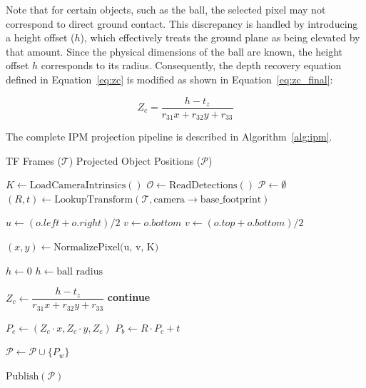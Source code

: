 \documentclass[journal]{IAENGtran}
\begin{document}
Note that for certain objects, such as the ball, the selected pixel may not correspond to direct
ground contact. This discrepancy is handled by introducing a height offset ($h$), which effectively
treats the ground plane as being elevated by that amount. Since the physical dimensions of the ball
are known, the height offset $h$ corresponds to its radius. Consequently, the depth recovery
equation defined in Equation~\ref{eq:zc} is modified as shown in Equation~\ref{eq:zc_final}:

\begin{equation} \label{eq:zc_final}
Z_c = \frac{h - t_z}{r_{31}x + r_{32}y + r_{33}}
\end{equation}

The complete IPM projection pipeline is described in
Algorithm~\ref{alg:ipm}.

\begin{algorithm}[!h]
\caption{IPM Package}
\label{alg:ipm}
\footnotesize
\begin{algorithmic}[1]
\Require TF Frames ($\mathcal{T}$)
\Ensure Projected Object Positions ($\mathcal{P}$)

\State $K \gets \text{LoadCameraIntrinsics}()$
    \State $\mathcal{O} \gets \text{ReadDetections}()$
    \State $\mathcal{P} \gets \emptyset$
    \State $(R, t) \gets \text{LookupTransform}(\mathcal{T}, \text{camera} \rightarrow \text{base\_footprint})$

        \State $u \gets (o.left + o.right)/2$
            \State $v \gets o.bottom$
        \Else
            \State $v \gets (o.top + o.bottom)/2$
        \EndIf

        \State $(x, y) \gets \text{NormalizePixel(u, v, K)}$

        \State $h \gets 0$
            \State $h \gets \text{ball radius}$
        \EndIf

        \State $Z_c \gets \dfrac{h - t_z}{r_{31}x + r_{32}y + r_{33}}$
            \State \textbf{continue}
        \EndIf

        \State $P_c \gets (Z_c \cdot x, Z_c \cdot y, Z_c)$
        \State $P_b \gets R \cdot P_c + t$

        \State $\mathcal{P} \gets \mathcal{P} \cup \{P_w\}$

    \EndFor

    \State $\text{Publish}(\mathcal{P})$
\EndWhile

\end{algorithmic}
\end{algorithm}
\end{document}
